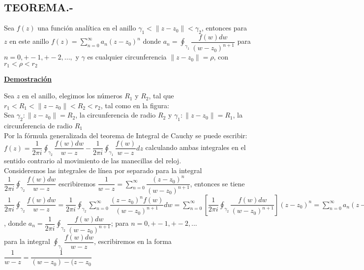 \documentclass[10pt,a4paper]{article}
\begin{document}
\subsection{TEOREMA.-}
Sea $f(z)$ una función analítica en el anillo $\displaystyle{\gamma_1 < \parallel z - z_0 \parallel < \gamma_2}$, entonces para $z$ en este anillo $\displaystyle{f(z) = \sum_{n = 0}^{\infty} a_n (z-z_0)^n}$ donde $\displaystyle{a_n = \oint_{\gamma_1} \dfrac{f(w) dw}{(w-z_0)^{n+1}}}$ para $\displaystyle{n = 0, +- 1, +-2,...,}$ y $\gamma$ es cualquier circunferencia $\parallel  z - z_0 \parallel = \rho$, con $r_1 < \rho < r_2$\\
 \begin{center}
  \textbf{\underline{Demostración}}
  \end{center} 
Sea $z$ en el anillo, elegimos los números $R_1$ y $R_2$, tal que $\displaystyle{r_1 < R_1 <  \parallel z -z_0  \parallel < R_2 < r_2}$, tal como en la figura: \\
Sea $\gamma_2 : \parallel z - z_0 \parallel = R_2$, la circunferencia de radio $R_2$ y $\gamma_1 : \parallel z -z_0 \parallel = R_1$, la circunferencia de radio $R_1$\\
Por la fórmula generalizada del teorema de Integral de Cauchy se puede escribir: \\
$\displaystyle{f(z) = \dfrac{1}{2 \pi i} \oint_{\gamma_2} \dfrac{f(w)dw}{w-z} - \dfrac{1}{2 \pi i} \oint_{\gamma_1} \dfrac{f(w)}{w-z}dz }$		
calculando ambas integrales en el sentido contrario al movimiento de las manecillas del reloj. \\
Consideremos las integrales de línea por separado para la integral $\displaystyle{\dfrac{1}{2 \pi i} \oint_{\gamma_2} \dfrac{f(w)dw}{w-z}}$ escribiremos $\displaystyle{\dfrac{1}{w-z} = \sum_{n=0}^{\infty} \dfrac{(z-z_0)^n}{(w-z_0)^{n+1}}}$, entonces se tiene\\
$\displaystyle{\dfrac{1}{2 \pi i} \oint_{\gamma_2} \dfrac{f(w)dw}{w-z} = \dfrac{1}{2 \pi i} \oint_{\gamma_2} \sum_{n=0}^{\infty}  \dfrac{(z-z_0)^n f(w)}{(w-z_0)^{n+1}} dw =  \sum_{n=0}^{\infty} [ \dfrac{1}{2 \pi i} \oint_{\gamma_2} \dfrac{f(w) dw}{(w-z_0)^{n+1}}] (z-z_0)^n=\sum_{n = 0}^{\infty} a_n (z-z_0)^n}$ , donde $\displaystyle{a_n = \dfrac{1}{2 \pi i} \oint_{\gamma_2} \dfrac{f(w) dw}{(w-z_0)^{n+1}}}$; para $\displaystyle{n = 0,+-1,+-2,...}$ \\
para la integral $\displaystyle{\oint_{\gamma_1} \dfrac{f(w) dw}{w-z}}$, escribiremos en la forma \\
$\displaystyle{\dfrac{1}{w-z} = \dfrac{1}{(w-z_0)-(z-z_0}}$
\end{document}

